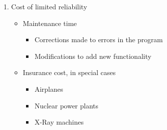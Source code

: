 \begin{enumerate}[noitemsep]
\item Cost of limited reliability
  \begin{itemize}[noitemsep]
  \item Maintenance time
    \begin{itemize}[noitemsep]
    \item Corrections made to errors in the program
    \item Modifications to add new functionality
    \end{itemize}

  \item Insurance cost, in special cases
    \begin{itemize}[noitemsep]
    \item Airplanes
    \item Nuclear power plants
    \item X-Ray machines
    \end{itemize}
  \end{itemize}
\end{enumerate}

